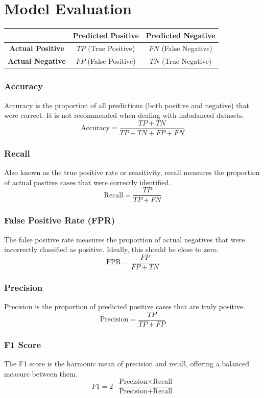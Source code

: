 \documentclass{article}
\begin{document}
\section{Model Evaluation}

\begin{center}
\begin{tabular}{|c|c|c|}
\hline
 & \textbf{Predicted Positive} & \textbf{Predicted Negative} \\
\hline
\textbf{Actual Positive} & $TP$ (True Positive) & $FN$ (False Negative) \\
\hline
\textbf{Actual Negative} & $FP$ (False Positive) & $TN$ (True Negative) \\
\hline
\end{tabular}
\end{center}

\subsubsection*{Accuracy}
Accuracy is the proportion of all predictions (both positive and negative) that were correct. It is not recommended when dealing with imbalanced datasets.
\[
\text{Accuracy} = \frac{TP + TN}{TP + TN + FP + FN}
\]

\subsubsection*{Recall}
Also known as the true positive rate or sensitivity, recall measures the proportion of actual positive cases that were correctly identified.
\[
\text{Recall} = \frac{TP}{TP + FN}
\]

\subsubsection*{False Positive Rate (FPR)}
The false positive rate measures the proportion of actual negatives that were incorrectly classified as positive. Ideally, this should be close to zero.
\[
\text{FPR} = \frac{FP}{FP + TN}
\]

\subsubsection*{Precision}
Precision is the proportion of predicted positive cases that are truly positive.
\[
\text{Precision} = \frac{TP}{TP + FP}
\]

\subsubsection*{F1 Score}
The F1 score is the harmonic mean of precision and recall, offering a balanced measure between them.
\[
F1 = 2 \cdot \frac{\text{Precision} \times \text{Recall}}{\text{Precision} + \text{Recall}}
\]
\end{document}
